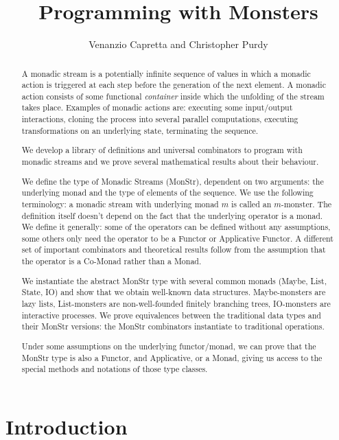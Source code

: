 \documentclass{article}
\title{Programming with Monsters}
\author{Venanzio Capretta and Christopher Purdy}
\begin{document}


\maketitle

\begin{abstract}
A monadic stream is a potentially infinite sequence of values in which a monadic action is triggered at each step before the generation of the next element.
A monadic action consists of some functional {\em container} inside which the unfolding of the stream takes place.
Examples of monadic actions are: executing some input/output interactions, cloning the process into several parallel computations, executing transformations on an underlying state, terminating the sequence.

We develop a library of definitions and universal combinators to program with monadic streams and we prove several mathematical results about their behaviour.

We define the type of Monadic Streams (MonStr), dependent on two arguments: the underlying monad and the type of elements of the sequence.
We use the following terminology: a monadic stream with underlying monad $m$ is called an $m$-monster.
The definition itself doesn't depend on the fact that the underlying operator is a monad.
We define it generally: some of the operators can be defined without any assumptions, some others only need the operator to be a Functor or Applicative Functor.
A different set of important combinators and theoretical results follow from the assumption that the operator is a Co-Monad rather than a Monad.

We instantiate the abstract MonStr type with several common monads (Maybe, List, State, IO) and show that we obtain well-known data structures.
Maybe-monsters are lazy lists, List-monsters are non-well-founded finitely branching trees, IO-monsters are interactive processes.
We prove equivalences between the traditional data types and their MonStr versions: the MonStr combinators instantiate to traditional operations.

Under some assumptions on the underlying functor/monad, we can prove that the MonStr type is also a Functor, and Applicative, or a Monad, giving us access to the special methods and notations of those type classes.
\end{abstract}

\section{Introduction}
\end{document}
